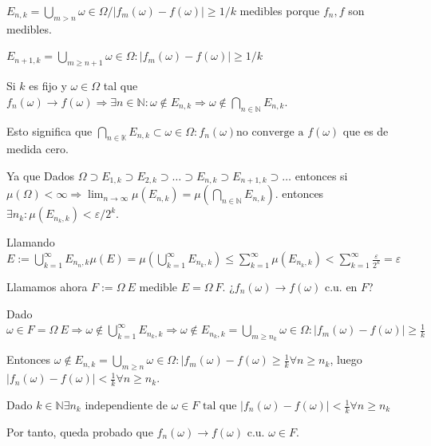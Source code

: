 \documentclass[11pt, a4paper]{article}
\makeatletter
\newif\IfInSansMode
\let\oldsf\sffamily
\renewcommand*{\sffamily}{\oldsf\mathversion{sans}\InSansModetrue}
\let\oldnorm\normalfont
\renewcommand*{\normalfont}{\oldnorm\InSansModefalse\mathversion{normal}}
\renewenvironment{proof}[1][\proofname] {\par\pushQED{\qed}\normalfont\topsep6\p@\@plus6\p@\relax\trivlist\item[\hskip\labelsep\itshape\sffamily#1\@addpunct{.}]\ignorespaces}{\popQED\endtrivlist\@endpefalse}
\theoremstyle{theorem-style}
\theoremstyle{definition-style}
\theoremstyle{remark-style}
\theoremstyle{example-style}
\makeatother
\begin{document}
\begin{proof}
  $E_{n,k} = \bigcup_{m > n} {\omega \in \Omega / |f_{m}(\omega) -f(\omega)|
    \geq 1/k}$ medibles porque $f_{n}, f$ son medibles.

  $E_{n+1,k} = \bigcup_{m \geq n+1} {\omega \in \Omega : |f_{m}(\omega) -
    f(\omega)| \geq 1/k}$

  Si $k$ es fijo y $\omega \in \Omega$ tal que ${f_{n}(\omega)} \rightarrow
  f(\omega) \Rightarrow \exists n \in \mathbb N : \omega \notin E_{n,k}
  \Rightarrow \omega \notin \bigcap_{n \in \mathbb N} E_{n,k}$.

  Esto significa que $\bigcap_{n \in \mathbb K} E_{n,k} \subset {\omega \in \Omega
    : f_{n}(\omega) \text{no converge a } f(\omega)} $ que es de medida cero.

  Ya que Dados $\Omega \supset E_{1,k} \supset E_{2,k} \supset \hdots \supset E_{n,k} \supset
  E_{n+1,k} \supset \hdots$ entonces si $\mu(\Omega) < \infty \Rightarrow
  \lim_{n\to\infty} \mu(E_{n,k}) = \mu(\bigcap_{n \in \mathbb N}
  E_{n,k})$. entonces $\exists n_{k} : \mu(E_{n_{k},k}) <
  \varepsilon/2^{k}$.

  Llamando $E := \bigcup_{k=1}^{\infty} E_{n_{n},k} \mu(E) =
  \mu(\bigcup_{k=1}^{\infty}E_{n_{k},k}) \leq \sum_{k=1}^{\infty}
  \mu(E_{n_{k},k}) < \sum_{k=1}^{\infty} \frac{\varepsilon}{2^{k}} =
  \varepsilon$

  Llamamos ahora $F:=\Omega \ E $ medible $E = \Omega \
  F$. ¿$f_{n}(\omega) \rightarrow f(\omega)$ c.u. en $F$?

  Dado $\omega \in F = \Omega \ E \Rightarrow \omega \notin
  \bigcup_{k=1}^{\infty} E_{n_{k},k} \Rightarrow \omega \notin E_{n_{k},k}
  = \bigcup_{m \geq n_{k}} {\omega \in \Omega : |f_{m}(\omega) -
    f(\omega)| \geq \frac{1}{k} }$

  Entonces $\omega \notin E_{n,k} = \bigcup_{m\geq n} {\omega \in \Omega :
    |f_{m}(\omega) - f(\omega) \geq \frac{1}{k}} \forall n \geq n_{k}$,
  luego $|f_{n}(\omega)- f(\omega)| < \frac{1}{k} \forall n \geq n_{k}$.

  Dado $k \in \mathbb N \exists n_{k} \text{ independiente de } \omega \in F
  \text{ tal que } |f_{n}(\omega) -
  f(\omega)| < \frac{1}{k} \forall n \geq n_{k}$

  Por tanto, queda probado que ${f_{n}(\omega)} \rightarrow f(\omega)$
  c.u. $\omega \in F$.


\end{proof}
\end{document}

